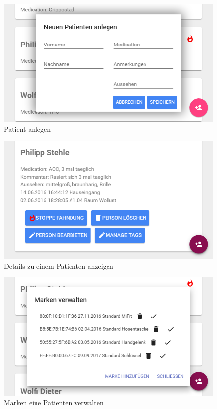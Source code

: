 \begin{figure}
	\centering
	\includegraphics[width=1.0\linewidth]{images/ui/personhinzufuegen}
	\caption{Patient anlegen}
	\label{img:ui/personhinzufuegen}
\end{figure}

\begin{figure}
	\centering
	\includegraphics[width=1.0\linewidth]{images/ui/persondetails}
	\caption{Details zu einem Patienten anzeigen}
	\label{img:ui/persondetails}
\end{figure}

\begin{figure}
	\centering
	\includegraphics[width=1.0\linewidth]{images/ui/markenverwalten}
	\caption{Marken eine Patienten verwalten}
	\label{img:ui/markenverwalten}
\end{figure}

